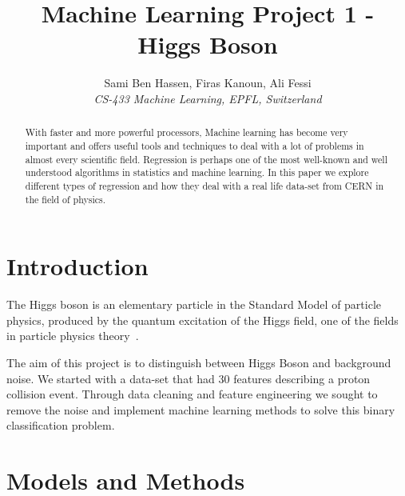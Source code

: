 \documentclass[10pt,conference,compsocconf]{IEEEtran}
\begin{document}
\title{Machine Learning Project 1 - Higgs Boson}

\author{
  Sami Ben Hassen, Firas Kanoun, Ali Fessi \\
  \textit{CS-433 Machine Learning, EPFL, Switzerland}
}

\maketitle

\begin{abstract}
  With faster and more powerful processors, Machine learning has become very important and offers useful tools and techniques to deal with a lot of problems in almost every scientific field.
  Regression is perhaps one of the most well-known and well understood algorithms in statistics and machine learning.
  In this paper we explore different types of regression and how they deal with a real life data-set from CERN in the field of physics.
\end{abstract}

\section{Introduction}

The Higgs boson is an elementary particle in the Standard Model of particle physics, produced by the quantum excitation of the Higgs field, one of the fields in particle physics theory~\cite{higgsboson}. 

The aim of this project is to distinguish between Higgs Boson and background noise. We started with a data-set that had 30 features describing a proton collision event. Through data cleaning and feature engineering we sought to remove the noise and implement machine learning methods to solve this binary classification problem.
\section{Models and Methods}
\label{sec:structure-paper}
\end{document}
